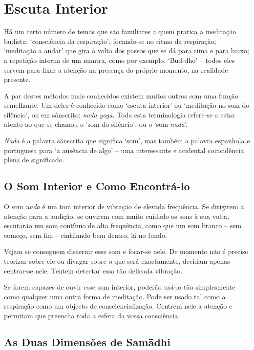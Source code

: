 \chapter{Escuta Interior}

Há um certo número de temas que são familiares a quem pratica a
meditação budista: `consciência da respiração', focando-se no ritmo da
respiração; `meditação a andar' que gira à volta dos passos que se dá
para cima e para baixo; a repetição interna de um mantra, como por
exemplo, `Bud-dho' -- todos eles servem para fixar a atenção na presença
do próprio momento, na realidade presente.

A par destes métodos mais conhecidos existem muitos outros com uma
função semelhante. Um deles é conhecido como `escuta interior' ou
`meditação no som do silêncio', ou em sânscrito: \emph{nada yoga}. Toda
esta terminologia refere-se a estar atento ao que se chamou o 'som do
silêncio', ou o `som \emph{nada}'.

\emph{Nada} é a palavra sânscrita que significa `som', mas também a palavra
espanhola e portuguesa para `a ausência de algo' -- uma interessante e acidental
coincidência plena de significado.


\section{O Som Interior e Como Encontrá-lo}

O som \emph{nada} é um tom interior de vibração de elevada frequência.
Se dirigirem a atenção para a audição, se ouvirem com muito cuidado os
sons à sua volta, escutarão um som contínuo de alta frequência, como que
um som branco -- sem começo, sem fim -- cintilando bem dentro, lá no
fundo.

Vejam se conseguem discernir esse som e focar-se nele. De momento não é
preciso teorizar sobre ele ou divagar sobre o que será exactamente,
decidam apenas centrar-se nele. Tentem detectar essa tão delicada
vibração.

Se forem capazes de ouvir esse som interior, poderão usá-lo tão
simplesmente como qualquer uma outra forma de meditação. Pode ser usado
tal como a respiração como um objecto de consciencialização. Centrem
nele a atenção e permitam que preencha toda a esfera da vossa
consciência.

\section{As Duas Dimensões de Samādhi}

